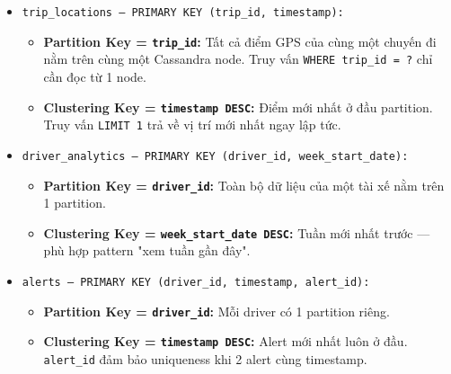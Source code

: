 \bigskip
\begin{itemize}
    \item \texttt{trip\_locations — PRIMARY KEY (trip\_id, timestamp):}
    \begin{itemize}
        \item \textbf{Partition Key = \texttt{trip\_id}:} Tất cả điểm GPS của cùng một chuyến đi nằm trên cùng một Cassandra node. Truy vấn \texttt{WHERE trip\_id = ?} chỉ cần đọc từ 1 node.
        \item \textbf{Clustering Key = \texttt{timestamp DESC}:} Điểm mới nhất ở đầu partition. Truy vấn \texttt{LIMIT 1} trả về vị trí mới nhất ngay lập tức.
    \end{itemize}

    \item \texttt{driver\_analytics — PRIMARY KEY (driver\_id, week\_start\_date):}
    \begin{itemize}
        \item \textbf{Partition Key = \texttt{driver\_id}:} Toàn bộ dữ liệu của một tài xế nằm trên 1 partition.
        \item \textbf{Clustering Key = \texttt{week\_start\_date DESC}:} Tuần mới nhất trước — phù hợp pattern "xem tuần gần đây".
    \end{itemize}

    \item \texttt{alerts — PRIMARY KEY (driver\_id, timestamp, alert\_id):}
    \begin{itemize}
        \item \textbf{Partition Key = \texttt{driver\_id}:} Mỗi driver có 1 partition riêng.
        \item \textbf{Clustering Key = \texttt{timestamp DESC}:} Alert mới nhất luôn ở đầu. \texttt{alert\_id} đảm bảo uniqueness khi 2 alert cùng timestamp.
    \end{itemize}
\end{itemize}
